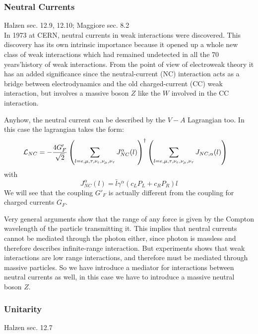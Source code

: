 \documentclass[TheoreticalPhy_ModB.tex]{subfiles}
\begin{document}
\subsubsection{Neutral Currents}

\textsf{Halzen sec. 12.9, 12.10; Maggiore sec. 8.2}\\

In 1973 at CERN, neutral currents in weak interactions were discovered. This discovery has its own intrinsic importance because it opened up a whole new class of weak interactions which had remained undetected in all the 70 years'history of weak interactions. From the point of view of electroweak theory it has an added significance since the neutral-current (NC) interaction acts as a bridge between electrodynamics and the old charged-current (CC) weak interaction, but involves a massive boson $Z$ like the $W$ involved in the CC interaction. 

Anyhow, the neutral current can be described by the $V-A$ Lagrangian too. In this case the lagrangian takes the form:
\begin{align}\label{eqn:neutral-lagrangian-VA}
\mathcal L_{NC}
&=-\frac{4G'_F}{\sqrt2}\left(\sum_{l=e,\mu,\tau,\nu_e,\nu_\mu,\nu_\tau}J_{NC}^{\alpha}(l)\right)^\dagger\left(\sum_{l=e,\mu,\tau,\nu_e,\nu_\mu,\nu_\tau}J_{NC,\alpha}(l)\right)
\end{align}
with
\begin{equation}\label{eqn:neutral-current-VA}
J_{NC}^{\alpha}(l)=\bar l\gamma^\alpha (c_LP_L+c_RP_R)l
\end{equation}
We will see that the coupling $G'_F$ is actually different from the coupling for charged currents $G_F$.

Very general arguments show that the range of any force is given by the Compton wavelength of the particle transmitting it. 
This implies that neutral currents cannot be mediated through the photon either, since photon is massless and therefore describes infinite-range interaction. But experiments shows that weak interactions are low range interactions, and therefore must be mediated through massive particles. So we have introduce a mediator for interactions between neutral currents as well, in this case we have to introduce a massive neutral boson $Z$.

\subsubsection{Unitarity}
\textsf{Halzen sec. 12.7}\\
\end{document}

